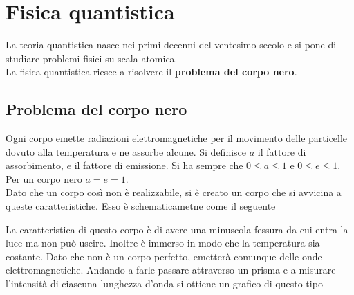 
\section{Fisica quantistica}
La teoria quantistica nasce nei primi decenni del ventesimo secolo e si pone di studiare problemi
fisici su scala atomica.\\
La fisica quantistica riesce a risolvere il \textbf{problema del corpo nero}.

\subsection{Problema del corpo nero}
Ogni corpo emette radiazioni elettromagnetiche per il movimento delle particelle dovuto alla 
temperatura e ne assorbe alcune. Si definisce $a$ il fattore di assorbimento, $e$ il fattore di 
emissione. Si ha sempre che $0\leq a\leq1$ e $0\leq e\leq1$. Per un corpo nero $a=e=1$.\\
Dato che un corpo così non è realizzabile, si è creato un corpo che si avvicina a queste 
caratteristiche. Esso è schematicametne come il seguente
\begin{center}
\end{center}
La caratteristica di questo corpo è di avere una minuscola fessura da cui entra la luce ma non può
uscire. Inoltre è immerso in modo che la temperatura sia costante. Dato che non è un corpo perfetto,
emetterà comunque delle onde elettromagnetiche. Andando a farle passare attraverso un prisma e a
misurare l'intensità di ciascuna lunghezza d'onda si ottiene un grafico di questo tipo
\begin{center}
\end{center}
